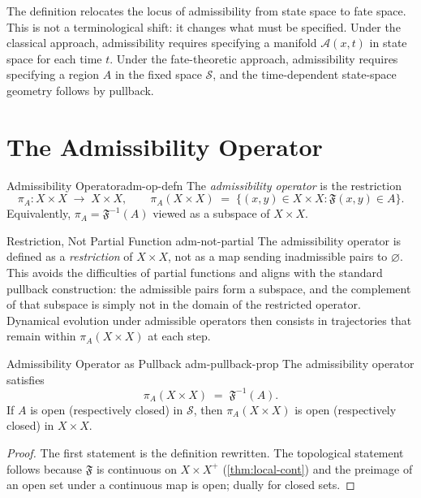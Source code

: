 \documentclass[12pt,twoside,openright]{book}
\newcommand{\adm}{\mathcal{A}}            %
\newcommand{\distPairs}{X\times X}
\newcommand{\fateMap}{\mathfrak{F}}
\newcommand{\fateSpace}{\mathcal{S}}
\newcommand{\admRegion}{A}
\newcommand{\admOp}{\pi_{\!\admRegion}}
\providecommand{\admRegion}{A}
\providecommand{\admOp}{\pi_{\!\admRegion}}
\begin{document}
The definition relocates the locus of admissibility from state
space to fate space. This is not a terminological shift: it
changes what must be specified. Under the classical approach,
admissibility requires specifying a manifold $\adm(x,t)$ in
state space for each time $t$. Under the fate-theoretic
approach, admissibility requires specifying a region $\admRegion$
in the fixed space $\fateSpace$, and the time-dependent state-space
geometry follows by pullback.

\section{The Admissibility Operator}

\begin{definition}{Admissibility Operator}{adm-op-defn}
The \emph{admissibility operator} is the restriction
\[
  \admOp:\distPairs\;\longrightarrow\;\distPairs,
  \qquad
  \admOp(\distPairs)
  \;=\;
  \bigl\{(x,y)\in\distPairs
    : \fateMap(x,y)\in\admRegion\bigr\}.
\]
Equivalently, $\admOp = \fateMap^{-1}(\admRegion)$ viewed as a
subspace of $\distPairs$.
\end{definition}

\begin{remark}{Restriction, Not Partial Function}%
  {adm-not-partial}
The admissibility operator is defined as a \emph{restriction}
of $\distPairs$, not as a map sending inadmissible pairs to
$\varnothing$. This avoids the difficulties of partial functions
and aligns with the standard pullback construction: the
admissible pairs form a subspace, and the complement of that
subspace is simply not in the domain of the restricted operator.
Dynamical evolution under admissible operators then consists in
trajectories that remain within $\admOp(\distPairs)$ at each
step.
\end{remark}

\begin{proposition}{Admissibility Operator as Pullback}%
  {adm-pullback-prop}
The admissibility operator satisfies
\[
  \admOp(\distPairs)
  \;=\;
  \fateMap^{-1}(\admRegion).
\]
If $\admRegion$ is open (respectively closed) in $\fateSpace$,
then $\admOp(\distPairs)$ is open (respectively closed) in
$\distPairs$.
\begin{proof}
The first statement is the definition rewritten. The
topological statement follows because $\fateMap$ is continuous
on $\distPairs^+$ (\cref{thm:local-cont}) and the preimage of
an open set under a continuous map is open; dually for closed sets.
\end{proof}
\end{proposition}
\end{document}
